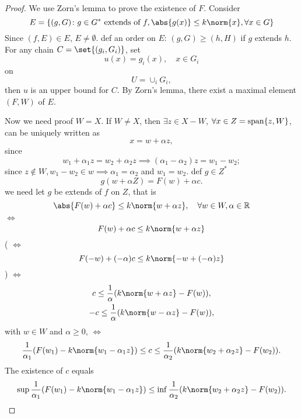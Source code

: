 \documentclass[a4paper]{book}
\DeclarePairedDelimiter{\norm}\lVert\rVert
\DeclarePairedDelimiter{\set}\lbrace\rbrace
\DeclarePairedDelimiter{\abs}\lvert\rvert
\def\R{\mathbb{R}}
\DeclareMathOperator{\spann}{span}
\newcommand\spanset[1]{\ensuremath\spann\{#1\}}
\begin{document}
 \begin{proof}
    We use Zorn's lemma to prove the existence of $F$. Consider
    \begin{equation}
        E = \{(g,G) \colon g \in G^* \text{ extends of } f, \abs{g(x)} \leq k\norm{x}, \forall x \in G\}
    \end{equation}
    Since $(f,E) \in E$, $E \neq \emptyset$.
    def an order on $E$: $(g,G) \geq (h,H)$ if $g$ extends $h$.
    For any chain $C=\set{(g_i, G_i)}$, set
    \[u(x) = g_i(x), \quad x \in G_i\]
    on
    \[U=\cup_i G_i,\]
    then $u$ is an upper bound for $C$.
    By Zorn's lemma, there exist a maximal element $(F,W)$ of $E$.

    Now we need proof $W = X$. If $W \neq X$, then $\exists z \in X-W$, $\forall x \in Z = \spanset{z, W}$, can be uniquely written as
    \[x = w +\alpha z,\]
    since
    \[w_1 + \alpha_1 z = w_2 +\alpha_2 z \implies (\alpha_1 - \alpha_2)z=w_1-w_2;\]
    since $z \notin W, w_1-w_2 \in w \implies \alpha_1 = \alpha_2$ and $w_1=w_2$. def $g \in Z^*$
    \[g(w+\alpha Z)=F(w)+\alpha c.\]
    we need let $g$ be extends of $f$ on $Z$, that is
    \begin{equation}
        \abs{F(w)+\alpha c} \leq k\norm{w+\alpha z}, \quad \forall w \in W, \alpha \in \R
    \end{equation}
    $\iff$
    \begin{equation}
        F(w)+\alpha c \leq k\norm{w+\alpha z}
    \end{equation}
    (
        $\iff$
        \begin{equation*}
            F(-w)+(-\alpha) c \leq k\norm{-w+(-\alpha) z}
        \end{equation*}
    )
    $\iff$
    \begin{gather*}
        c \leq \frac{1}{\alpha}(k\norm{w+\alpha z} - F(w)),\\
        -c \leq \frac{1}{\alpha}(k\norm{w-\alpha z} - F(w)),
    \end{gather*}
    with $w \in W$ and $\alpha \geq 0$, $\iff$
    \begin{equation}
        \frac{1}{\alpha_1}(F(w_1) - k\norm{w_1-\alpha_1 z}) \leq c \leq \frac{1}{\alpha_2}(k\norm{w_2+\alpha_2 z} - F(w_2)).
    \end{equation}
    The existence of $c$ equals
    \begin{equation*}
        \sup \frac{1}{\alpha_1}(F(w_1) - k\norm{w_1-\alpha_1 z}) \leq \inf \frac{1}{\alpha_2}(k\norm{w_2+\alpha_2 z} - F(w_2)).
    \end{equation*}

\end{proof}
\end{document}
